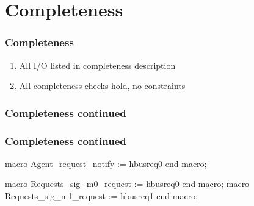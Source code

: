 \documentclass[]{beamer}
\begin{document}
\begin{frame}
\begin{columns}
           \end{columns}
         \end{frame}


       \section{Completeness}
       \begin{frame}
        \frametitle{Completeness}
          \begin{enumerate}
              \item<1-> All I/O listed in completeness description
              \item<1-> All completeness checks hold, no constraints
          \end{enumerate}
       \end{frame}

       \begin{frame}
         \frametitle{Completeness continued}
           \begin{center}
           \end{center}

       \end{frame}
       \begin{frame}[fragile]
         \frametitle{Completeness continued}
       \begin{VHI}
macro Agent_request_notify := hbusreq0 end macro;
 

macro Requests_sig_m0_request := hbusreq0 end macro;
macro Requests_sig_m1_request := hbusreq1 end macro;
       \end{VHI}
       \end{frame}
\end{document}
